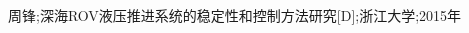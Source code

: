 \begin{thebibliography}{0}

     	周锋;深海ROV液压推进系统的稳定性和控制方法研究[D];浙江大学;2015年
     
\end{thebibliography}